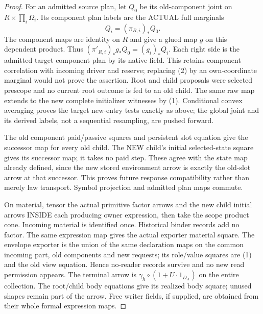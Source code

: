 \documentclass[11pt]{article}
\begin{document}
\begin{proof}
For an admitted source plan, let $Q_0$ be its old-component joint on $R\times\prod_i\Omega_i$. Its component plan labels are the ACTUAL full marginals
\[
                   Q_i=(\pi_{R,i})_*Q_0.                 \tag{2}
\]
The component maps are identity on $R$ and give a glued map $g$ on this dependent product. Thus
$(\pi'_{R,i})_*g_*Q_0=(g_i)_*Q_i$.
Each right side is the admitted target component plan by its native field. This retains component correlation with incoming driver and reserve; replacing (2) by an own-coordinate marginal would not prove the assertion. Root and child proposals were selected prescope and no current root outcome is fed to an old child. The same raw map extends to the new complete initializer witnesses by (1). Conditional convex averaging proves the target new-entry tests exactly as above; the global joint and its derived labels, not a sequential resampling, are pushed forward.

The old component paid/passive squares and persistent slot equation give the successor map for every old child. The NEW child's initial selected-state square gives its successor map; it takes no paid step. These agree with the state map already defined, since the new stored environment arrow is exactly the old-slot arrow at that successor. This proves future response compatibility rather than merely law transport. Symbol projection and admitted plan maps commute.

On material, tensor the actual primitive factor arrows and the new child initial arrows INSIDE each producing owner expression, then take the scope product cone. Incoming material is identified once. Historical binder records add no factor. The same expression map gives the actual exporter material square. The envelope exporter is the union of the same declaration maps on the common incoming part, old components and new requests; its role/value squares are (1) and the old view equation. Hence no-reader records survive and no new read permission appears. The terminal arrow is
$\gamma_h\circ(1+U\cdot1_{D_X})$ on the entire collection. The root/child body equations give its realized body square; unused shapes remain part of the arrow. Free writer fields, if supplied, are obtained from their whole formal expression maps.


\end{proof}
\end{document}
